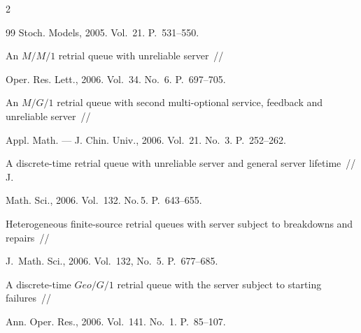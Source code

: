 \begin{multicols}{2}
{{\begin{thebibliography}{99}
Stoch. Models, 2005. Vol.~21. P.~531--550.









An $M/M/1$ retrial queue with unreliable server~//


Oper. Res. Lett., 2006. Vol.~34. No.~6. P.~697--705.









An $M/G/1$ retrial queue with second multi-optional service, feedback and unreliable server~//


Appl. Math. --- J. Chin. Univ., 2006. Vol.~21. No.~3. P.~252--262.









A discrete-time retrial queue with unreliable server and general server lifetime~// J.\ 


Math. Sci., 2006. Vol.~132. No.\,5. P.~643--655.












Heterogeneous finite-source retrial queues with server subject to breakdowns and repairs~//


J.\ Math. Sci., 2006. Vol.~132, No.~5. P.~677--685.









A discrete-time $Geo/G/1$ retrial queue with the server subject to starting failures~//


Ann. Oper. Res., 2006. Vol.~141. No.~1. P.~85--107.










\end{thebibliography}}}
\end{multicols}
